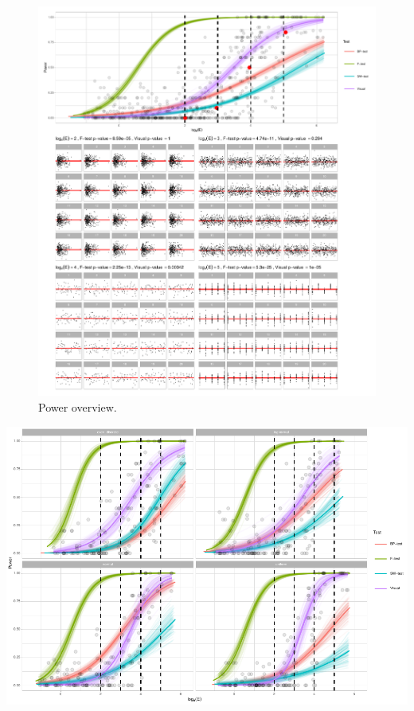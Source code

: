 \documentclass[]{interact}
\theoremstyle{plain}%
\theoremstyle{definition}
\theoremstyle{remark}
\begin{document}
\begin{figure}
\centering
\includegraphics{paper_comparison_files/figure-latex/power-overview-1.pdf}
\caption{Power overview. \label{fig:power-overview}}
\end{figure}

\includegraphics{paper_comparison_files/figure-latex/unnamed-chunk-9-1.pdf}
\end{document}
